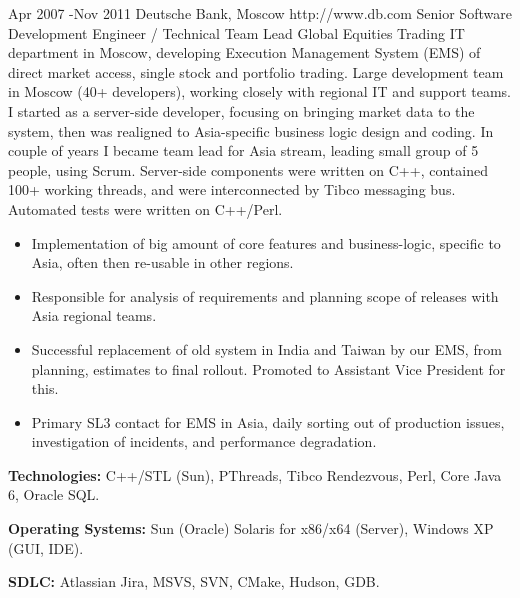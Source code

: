 \documentclass[10pt]{article} %
\begin{document}

\job
{Apr 2007 -}{Nov 2011}
{Deutsche Bank, Moscow}
{http://www.db.com}
{Senior Software Development Engineer / Technical Team Lead}
{Global Equities Trading IT department in Moscow, developing Execution Management System (EMS) of direct market access,
single stock and portfolio trading. Large development team in Moscow (40+ developers), working closely with regional IT 
and support teams. I started as a server-side developer, focusing on bringing market data to the system, then was realigned
to Asia-specific business logic design and coding. In couple of years I became team lead for Asia stream, 
leading small group of 5 people, using Scrum. Server-side components were written on C++, contained 100+ working threads,
and were interconnected by Tibco messaging bus. Automated tests were written on C++/Perl.}
{\begin{itemize}
\item{Implementation of big amount of core features and business-logic, specific to Asia, often then re-usable in other regions.}
\item{Responsible for analysis of requirements and planning scope of releases with Asia regional teams.}
\item{Successful replacement of old system in India and Taiwan by our EMS, from planning, estimates to final rollout.
Promoted to Assistant Vice President for this.}
\item{Primary SL3 contact for EMS in Asia, daily sorting out of production issues, investigation of incidents,
and performance degradation.}
\end{itemize}}
{\rule{0mm}{5mm}\textbf{Technologies:} C++/STL (Sun), PThreads, Tibco Rendezvous, Perl, Core Java 6, Oracle SQL.\\
\rule{0mm}{5mm}\textbf{Operating Systems:} Sun (Oracle) Solaris for x86/x64 (Server), Windows XP (GUI, IDE).\\
\rule{0mm}{5mm}\textbf{SDLC:} Atlassian Jira, MSVS, SVN, CMake, Hudson, GDB.
}

\end{document}
